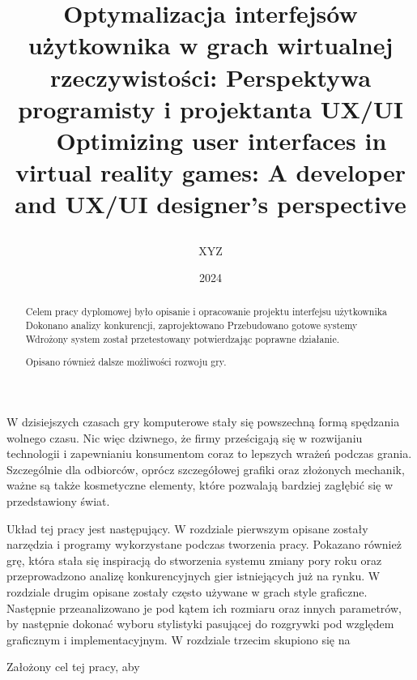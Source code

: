 \documentclass[xodstep]{wnspt}
\author   {XYZ}
\date     {2024}
\title{\begin{LARGE}Optymalizacja interfejsów użytkownika w grach wirtualnej rzeczywistości: Perspektywa programisty i projektanta UX/UI
\\{~}
Optimizing user interfaces in virtual reality games: A developer and UX/UI designer's perspective
\end{LARGE}}
\begin{document}
\begin{abstract}
Celem pracy dyplomowej było opisanie i opracowanie projektu interfejsu użytkownika
Dokonano analizy konkurencji, zaprojektowano 
Przebudowano gotowe systemy
Wdrożony system został przetestowany potwierdzając poprawne działanie.


Opisano również dalsze możliwości rozwoju gry.
\end{abstract}

\maketitle

\onehalfspacing

\introduction

W dzisiejszych czasach gry komputerowe stały się powszechną formą spędzania wolnego czasu. Nic więc dziwnego, że firmy prześcigają się w rozwijaniu technologii i zapewnianiu konsumentom coraz to lepszych wrażeń podczas grania. Szczególnie dla odbiorców, oprócz szczegółowej grafiki oraz złożonych mechanik, ważne są także kosmetyczne elementy, które pozwalają bardziej zagłębić się w przedstawiony świat.


	
	Układ tej pracy jest następujący. W rozdziale pierwszym opisane zostały narzędzia i programy wykorzystane podczas tworzenia pracy. Pokazano również grę, która stała się inspiracją do stworzenia systemu zmiany pory roku oraz przeprowadzono analizę konkurencyjnych gier istniejących już na rynku. W rozdziale drugim opisane zostały często używane w grach style graficzne. Następnie przeanalizowano je pod kątem ich rozmiaru oraz innych parametrów, by następnie dokonać wyboru stylistyki pasującej do rozgrywki pod względem graficznym i implementacyjnym. 
W rozdziale trzecim skupiono się na







\summary
Założony cel tej pracy, aby 



\printbibliography[type=book,title={Books only}]

\listoffigures

\lstlistoflistings
\end{document}
